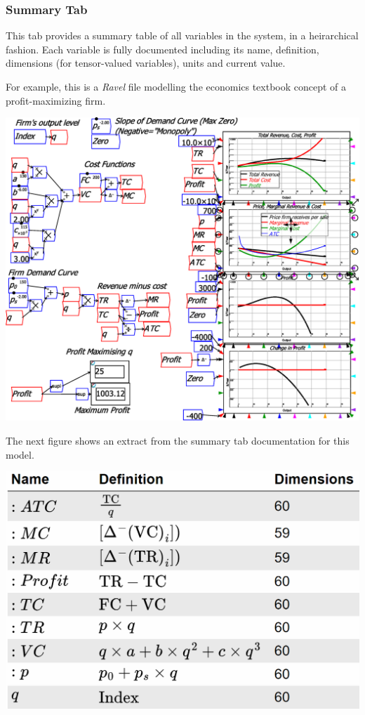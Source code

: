 \subsubsection{Summary Tab}

\label{tabs:Summary}

This tab provides a summary table of all variables in the system,
in a heirarchical fashion. Each variable is fully documented including
its name, definition, dimensions (for tensor-valued variables), units
and current value.

For example, this is a \emph{Ravel} file modelling the economics textbook
concept of a profit-maximizing firm.

\noindent\includegraphics[width=\textwidth]{images/NeoclassicalModelOfFirm}

The next figure shows an extract from the summary tab documentation
for this model.

\noindent\includegraphics[width=\textwidth]{images/SummaryTabScreenshot}


